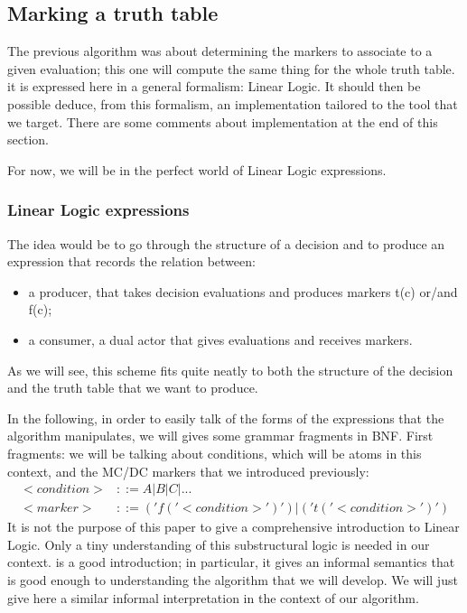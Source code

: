 \documentclass[a4paper,12pt,twoside]{article}
\begin{document}
\subsection{Marking a truth table}

The previous algorithm was about determining the markers to associate
to a given evaluation; this one will compute the same thing for the
whole truth table. it is expressed here in a general formalism: Linear
Logic. It should then be possible deduce, from this formalism, an
implementation tailored to the tool that we target. There are some
comments about implementation at the end of this section.

For now, we will be in the perfect world of Linear Logic expressions.

\subsubsection{Linear Logic expressions}

The idea would be to go through the structure of a decision and to produce
an expression that records the relation between:
\begin{itemize}
\item a producer, that takes decision evaluations and produces markers t(c)
      or/and f(c);
\item a consumer, a dual actor that gives evaluations and receives markers.
\end{itemize}

As we will see, this scheme fits quite neatly to both the structure
of the decision and the truth table that we want to produce.

In the following, in order to easily talk of the forms of the
expressions that the algorithm manipulates, we will gives some grammar
fragments in BNF.  First fragments: we will be talking about
conditions, which will be atoms in this context, and the MC/DC markers
that we introduced previously:
\begin{align*}
 <condition> & ::= A | B | C | ...\\
 <marker>    & ::= ('f(' <condition>  ')' ) | ( 't(' <condition> ')')
\end{align*}
It is not the purpose of this paper to give a comprehensive
introduction to Linear Logic. Only a tiny understanding of this
substructural logic is needed in our context.
\cite{linear-logic-primer} is a good introduction; in particular, it
gives an informal semantics that is good enough to understanding the
algorithm that we will develop. We will just give here a similar
informal interpretation in the context of our algorithm.
\end{document}
